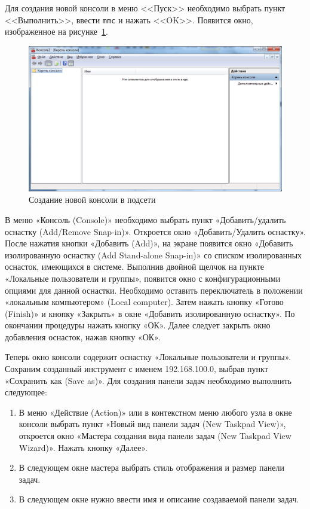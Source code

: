Для создания новой консоли в меню <<Пуск>> необходимо выбрать пункт <<Выполнить>>,
ввести \texttt{mmc} и нажать <<OK>>. Появится окно, изображенное
на рисунке~\ref{pic:mmc_opened}.
\begin{figure}[h!]
  \centering
  \includegraphics[width=0.8\linewidth]{pic/mmc_opened}
  \caption{Создание новой консоли в подсети}
  \label{pic:mmc_opened}
\end{figure}


В меню «Консоль (Console)» необходимо выбрать пункт
«Добавить/удалить оснастку (Add/Remove Snap-in)».
Откроется окно «Добавить/Удалить оснастку».
После нажатия кнопки «Добавить (Add)», на экране появится
окно «Добавить изолированную оснастку (Add Stand-alone Snap-in)» со списком
изолированных оснасток, имеющихся в системе. Выполнив двойной щелчок
на пункте «Локальные пользователи и группы», появится окно с
конфигурационными опциями для данной оснастки.
Необходимо оставить переключатель в положении
«локальным компьютером» (Local computer).
Затем нажать кнопку «Готово (Finish)» и кнопку «Закрыть» в окне
«Добавить изолированную оснастку». По окончании процедуры нажать кнопку «ОК».
Далее следует закрыть окно добавления оснасток, нажав кнопку «ОК».

Теперь окно консоли содержит оснастку «Локальные пользователи и группы».
Сохраним созданный инструмент с именем 192.168.100.0, выбрав пункт «Сохранить как (Save as)».
Для создания панели задач необходимо выполнить следующее:
\begin{enumerate}
\item В меню «Действие (Action)» или в контекстном меню любого узла
в окне консоли выбрать пункт «Новый вид панели задач (New Taskpad View)»,
откроется окно «Мастера создания вида панели задач (New Taskpad View Wizard)».
Нажать кнопку «Далее».
\item В следующем окне мастера выбрать стиль отображения и размер панели задач.
\item В следующем окне нужно ввести имя и описание создаваемой панели задач.
\end{enumerate}

